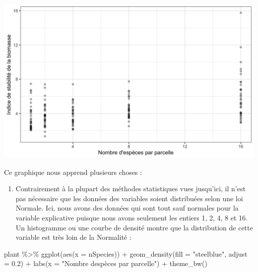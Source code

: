 \documentclass[
  a4paper,
]{article}
\newenvironment{Shaded}{\begin{snugshade}}{\end{snugshade}}
\newcommand{\AttributeTok}[1]{\textcolor[rgb]{0.00,0.34,0.68}{#1}}
\newcommand{\FloatTok}[1]{\textcolor[rgb]{0.69,0.50,0.00}{#1}}
\newcommand{\FunctionTok}[1]{\textcolor[rgb]{0.39,0.29,0.61}{#1}}
\newcommand{\NormalTok}[1]{\textcolor[rgb]{0.12,0.11,0.11}{#1}}
\newcommand{\SpecialCharTok}[1]{\textcolor[rgb]{0.24,0.68,0.91}{#1}}
\newcommand{\StringTok}[1]{\textcolor[rgb]{0.75,0.01,0.01}{#1}}
\providecommand{\tightlist}{%
  \setlength{\itemsep}{0pt}\setlength{\parskip}{0pt}}
\begin{document}
\begin{center}\includegraphics[width=0.9\linewidth]{figure/unnamed-chunk-114-1} \end{center}

Ce graphique nous apprend plusieurs choses :

\begin{enumerate}
\def\labelenumi{\arabic{enumi}.}
\tightlist
\item
  Contrairement à la plupart des méthodes statistiques vues jusqu'ici, il n'est pas nécessaire que les données des variables soient distribuées selon une loi Normale. Ici, nous avons des données qui sont tout sauf normales pour la variable explicative puisque nous avons seulement les entiers 1, 2, 4, 8 et 16. Un histogramme ou une courbe de densité montre que la distribution de cette variable est très loin de la Normalité :
\end{enumerate}

\begin{Shaded}
\begin{Highlighting}[]
\NormalTok{plant }\SpecialCharTok{\%\textgreater{}\%} 
  \FunctionTok{ggplot}\NormalTok{(}\FunctionTok{aes}\NormalTok{(}\AttributeTok{x =}\NormalTok{ nSpecies)) }\SpecialCharTok{+}
  \FunctionTok{geom\_density}\NormalTok{(}\AttributeTok{fill =} \StringTok{"steelblue"}\NormalTok{, }\AttributeTok{adjust =} \FloatTok{0.2}\NormalTok{) }\SpecialCharTok{+}
  \FunctionTok{labs}\NormalTok{(}\AttributeTok{x =} \StringTok{"Nombre d\textquotesingle{}espèces par parcelle"}\NormalTok{) }\SpecialCharTok{+}
  \FunctionTok{theme\_bw}\NormalTok{()}
\end{Highlighting}
\end{Shaded}
\end{document}
